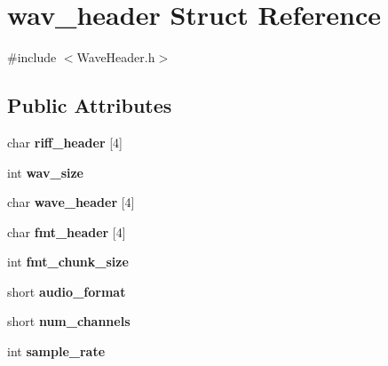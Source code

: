 \hypertarget{structwav__header}{}\section{wav\+\_\+header Struct Reference}
\label{structwav__header}


{\ttfamily \#include $<$Wave\+Header.\+h$>$}

\subsection*{Public Attributes}
\begin{DoxyCompactItemize}
\item 
\mbox{\label{structwav__header_a977b8193bf1f39dbd815c6210f0bb6c6}} 
char {\bfseries riff\+\_\+header} \mbox{[}4\mbox{]}
\item 
\mbox{\label{structwav__header_a89a86a26a94e726411e34517bfc9105e}} 
int {\bfseries wav\+\_\+size}
\item 
\mbox{\label{structwav__header_a0dc0cff34ad7fe5e59c5cbcee1640354}} 
char {\bfseries wave\+\_\+header} \mbox{[}4\mbox{]}
\item 
\mbox{\label{structwav__header_a4039d1e8e91d7940aa45a29aad27b4ce}} 
char {\bfseries fmt\+\_\+header} \mbox{[}4\mbox{]}
\item 
\mbox{\label{structwav__header_a5fb4363d52bbff51ca2e8884408208c6}} 
int {\bfseries fmt\+\_\+chunk\+\_\+size}
\item 
\mbox{\label{structwav__header_a94c9ee0387f846c47eb9e97636994d93}} 
short {\bfseries audio\+\_\+format}
\item 
\mbox{\label{structwav__header_a625d84de0f598e50c072d725f6e3b6b8}} 
short {\bfseries num\+\_\+channels}
\item 
\mbox{\label{structwav__header_a0632019c676aa88f0351c0ab11461de0}} 
int {\bfseries sample\+\_\+rate}
\item 
\mbox{\label{structwav__header_a8330740d45200d6aee4ba54fc0d834d8}} 

\end{DoxyCompactItemize}
